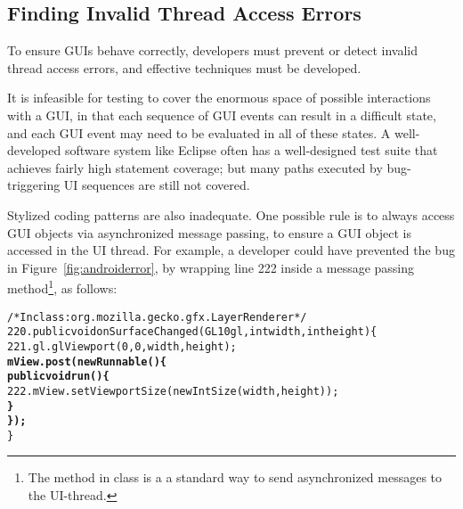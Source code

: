 


\subsection{Finding Invalid Thread Access Errors}
\label{sec:finding}

To ensure GUIs behave correctly, developers must prevent or detect invalid thread
access errors, and effective techniques must be developed.%

It is infeasible for testing to cover the enormous space of possible interactions
with a GUI, in that each sequence of GUI events can result in
a difficult state, and each GUI event may need to be evaluated in all of
these states. A well-developed software system like Eclipse
often has a well-designed test suite that achieves fairly high statement coverage;
but many paths executed by bug-triggering UI sequences are still not covered.

Stylized coding patterns are also inadequate. One possible rule is to always
access GUI objects via asynchronized message passing, to ensure a GUI object is accessed in
the UI thread. For example, a developer could have prevented the bug in Figure~\ref{fig:androiderror},
by wrapping line 222 inside a  message passing method\footnote{The
 method in class  is a
a standard way to send asynchronized messages to the UI-thread.}, as follows:


\begin{CodeOut}
\begin{alltt}
     /* In class: org.mozilla.gecko.gfx.LayerRenderer */
220. public void onSurfaceChanged(GL10 gl, int width, int height) \{
221.     gl.glViewport(0, 0, width, height);
         \textbf{mView.post(new Runnable() \{}
             \textbf{public void run() \{}
222.             mView.setViewportSize(new IntSize(width, height));
             \textbf{\}}
         \textbf{\});}
     \}
\end{alltt}
\end{CodeOut}

